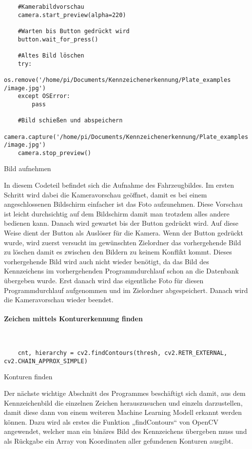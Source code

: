 \begin{longlisting}
    \begin{verbatim}
    #Kamerabildvorschau
    camera.start_preview(alpha=220)

    #Warten bis Button gedrückt wird
    button.wait_for_press()

    #Altes Bild löschen
    try:
        os.remove('/home/pi/Documents/Kennzeichenerkennung/Plate_examples /image.jpg')
    except OSError:
        pass

    #Bild schießen und abspeichern 
    camera.capture('/home/pi/Documents/Kennzeichenerkennung/Plate_examples /image.jpg')
    camera.stop_preview()
    \end{verbatim}
    \caption{Bild aufnehmen}
\end{longlisting}

In diesem Codeteil befindet sich die Aufnahme des Fahrzeugbildes. Im ersten Schritt wird dabei die Kameravorschau geöffnet, damit es 
bei einem angeschlossenen Bildschirm einfacher ist das Foto aufzunehmen. Diese Vorschau ist leicht durchsichtig auf dem Bildschirm 
damit man trotzdem alles andere bedienen kann. Danach wird gewartet bis der Button gedrückt wird. Auf diese Weise dient der Button als 
Auslöser für die Kamera. Wenn der Button gedrückt wurde, wird zuerst versucht im gewünschten Zielordner das vorhergehende Bild zu löschen 
damit es zwischen den Bildern zu keinem Konflikt kommt. Dieses vorhergehende Bild wird auch nicht wieder benötigt, da das Bild des 
Kennzeichens im vorhergehenden Programmdurchlauf schon an die Datenbank übergeben wurde. Erst danach wird das eigentliche Foto für 
diesen Programmdurchlauf aufgenommen und im Zielordner abgespeichert. Danach wird die Kameravorschau wieder beendet.

\paragraph{Zeichen mittels Konturerkennung finden}\mbox{}\\

\begin{listing}[H]
    \begin{verbatim}
    cnt, hierarchy = cv2.findContours(thresh, cv2.RETR_EXTERNAL, cv2.CHAIN_APPROX_SIMPLE)
    \end{verbatim}
    \caption{Konturen finden}
\end{listing}

Der nächste wichtige Abschnitt des Programmes beschäftigt sich damit, aus dem Kennzeichenbild die einzelnen Zeichen herauszusuchen und einzeln 
darzustellen, damit diese dann von einem weiteren Machine Learning Modell erkannt werden können. Dazu wird als erstes die Funktion „findContours“ 
von OpenCV angewendet, welcher man ein binäres Bild des Kennzeichens übergeben muss und als Rückgabe ein Array von Koordinaten aller gefundenen Konturen ausgibt. 

